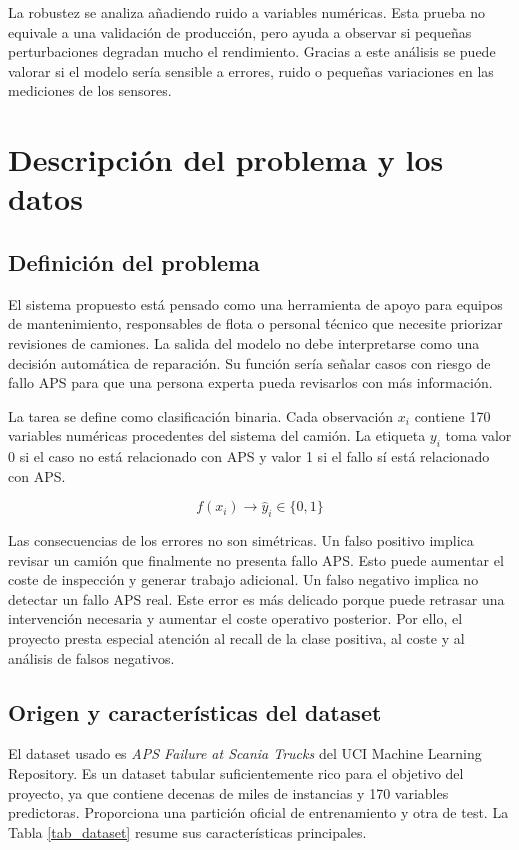 \documentclass[11pt,a4paper]{article}
\begin{document}
La robustez se analiza añadiendo ruido a variables numéricas. Esta prueba no equivale a una validación de producción, pero ayuda a observar si pequeñas perturbaciones degradan mucho el rendimiento. Gracias a este análisis se puede valorar si el modelo sería sensible a errores, ruido o pequeñas variaciones en las mediciones de los sensores.

\section{Descripción del problema y los datos}
\label{sec_problema_datos}

\subsection{Definición del problema}
\label{sec_definicion_problema}

El sistema propuesto está pensado como una herramienta de apoyo para equipos de mantenimiento, responsables de flota o personal técnico que necesite priorizar revisiones de camiones. La salida del modelo no debe interpretarse como una decisión automática de reparación. Su función sería señalar casos con riesgo de fallo APS para que una persona experta pueda revisarlos con más información.

La tarea se define como clasificación binaria. Cada observación \(x_i\) contiene 170 variables numéricas procedentes del sistema del camión. La etiqueta \(y_i\) toma valor 0 si el caso no está relacionado con APS y valor 1 si el fallo sí está relacionado con APS.

\[
f(x_i) \rightarrow \hat{y}_i \in \{0,1\}
\]

Las consecuencias de los errores no son simétricas. Un falso positivo implica revisar un camión que finalmente no presenta fallo APS. Esto puede aumentar el coste de inspección y generar trabajo adicional. Un falso negativo implica no detectar un fallo APS real. Este error es más delicado porque puede retrasar una intervención necesaria y aumentar el coste operativo posterior. Por ello, el proyecto presta especial atención al recall de la clase positiva, al coste y al análisis de falsos negativos.

\subsection{Origen y características del dataset}
\label{sec_dataset}

El dataset usado es \textit{APS Failure at Scania Trucks} del UCI Machine Learning Repository. Es un dataset tabular suficientemente rico para el objetivo del proyecto, ya que contiene decenas de miles de instancias y 170 variables predictoras. Proporciona una partición oficial de entrenamiento y otra de test. La Tabla \ref{tab_dataset} resume sus características principales.
\end{document}
